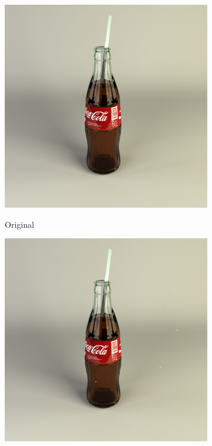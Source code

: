 \documentclass[a4paper,11pt,onecolumn]{memoir}
\begin{document}
\begin{figure}[ht]
    \centering
    \begin{subfigure}[b]{0.45\textwidth}
        \includegraphics[width=\textwidth]{coca_cola.png}
        \label{subfig:coca_cola}
        \caption{Original}
    \end{subfigure}
    \qquad
    \begin{subfigure}[b]{0.45\textwidth}
        \includegraphics[width=\textwidth]{coca_cola_wm_ko.png}

\end{subfigure}
\end{figure}
\end{document}
